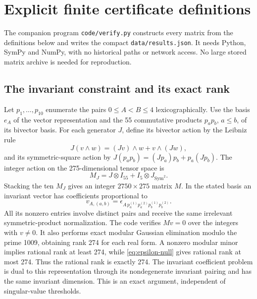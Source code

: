 \appendix
\section{Explicit finite certificate definitions}
\label{app:certificates}

The companion program \texttt{code/verify.py} constructs every matrix from
the definitions below and writes the compact \texttt{data/results.json}.
It needs Python, SymPy and NumPy, with no historical paths or network access.
No large stored matrix archive is needed for reproduction.

\subsection{The invariant constraint and its exact rank}

Let $p_1,\ldots,p_{10}$ enumerate the pairs $0\leq A<B\leq4$
lexicographically.
Use the basis $e_A$ of the vector representation and the 55 commutative
products $p_ap_b$, $a\leq b$, of its bivector basis.
For each generator $J$, define its bivector action by the Leibniz rule
\begin{equation}
 J(v\wedge w)=(Jv)\wedge w+v\wedge(Jw),
\end{equation}
and its symmetric-square action by
$J(p_ap_b)=(Jp_a)p_b+p_a(Jp_b)$.
The integer action on the 275-dimensional tensor space is
\begin{equation}
 M_J=J\otimes I_{55}+I_5\otimes J_{\mathrm{Sym}^2}.
\end{equation}
Stacking the ten $M_J$ gives an integer $2750\times275$ matrix $M$.
In the stated basis an invariant vector has coefficients proportional to
\begin{equation}
 v_{A,(a,b)}=\epsilon_{A\,p_a^{(1)}p_a^{(2)}p_b^{(1)}p_b^{(2)}} .
 \label{eq:epsilon-null}
\end{equation}
All its nonzero entries involve distinct pairs and receive the same
irrelevant symmetric-product normalization.
The code verifies $Mv=0$ over the integers with $v\ne0$.
It also performs exact modular Gaussian elimination modulo the prime 1009,
obtaining rank 274 for each real form.
A nonzero modular minor implies rational rank at least 274, while
\eqref{eq:epsilon-null} gives rational rank at most 274.
Thus the rational rank is exactly 274.
The invariant coefficient problem is dual to this representation through its
nondegenerate invariant pairing and has the same invariant dimension.
This is an exact argument, independent of singular-value thresholds.

